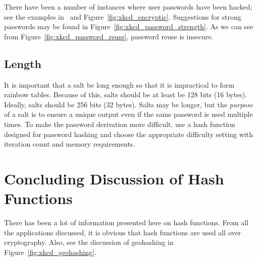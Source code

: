 There have been a number of instances where user passwords have been
hacked; see the examples in~\cite{blocki2018economics}
and Figure~\ref{fig:xkcd_encryptic}.
Suggestions for strong passwords may be found in
Figure~\ref{fig:xkcd_password_strength}.
As we can see from Figure~\ref{fig:xkcd_password_reuse},
password reuse is insecure.





\subsection*{ Length}

It is important that a \gls{salt} be long enough so that it is
impractical to form rainbow tables.
Because of this, \glspl{salt} should be at least be 128 bits (16 bytes).
Ideally, \glspl{salt} should be 256 bits (32 bytes).
Salts may be longer, but the \emph{purpose} of a \gls{salt}
is to ensure a unique output even if the same password is used multiple times.
To make the password derivation more difficult,
use a \gls{hash function} designed for password hashing and
choose the appropriate difficulty setting with iteration count
and memory requirements.



\section{Concluding Discussion of Hash Functions}

There has been a lot of information presented here on \glspl{hash function}.
From all the applications discussed, it is obvious
that \glspl{hash function} are used all over cryptography.
Also, see the discussion of geohashing in Figure~\ref{fig:xkcd_geohashing}.


